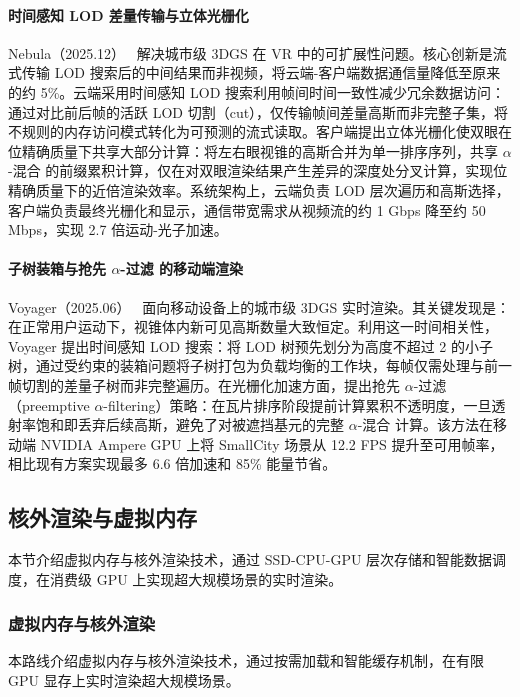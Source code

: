 \paragraph{时间感知 LOD 差量传输与立体光栅化}

Nebula（2025.12）~\cite{2512_20495} 解决城市级 3DGS 在 VR 中的可扩展性问题。核心创新是流式传输 LOD 搜索后的中间结果而非视频，将云端-客户端数据通信量降低至原来的约 5\%。云端采用时间感知 LOD 搜索利用帧间时间一致性减少冗余数据访问：通过对比前后帧的活跃 LOD 切割（cut），仅传输帧间差量高斯而非完整子集，将不规则的内存访问模式转化为可预测的流式读取。客户端提出立体光栅化使双眼在位精确质量下共享大部分计算：将左右眼视锥的高斯合并为单一排序序列，共享 $\alpha$-混合 的前缀累积计算，仅在对双眼渲染结果产生差异的深度处分叉计算，实现位精确质量下的近倍渲染效率。系统架构上，云端负责 LOD 层次遍历和高斯选择，客户端负责最终光栅化和显示，通信带宽需求从视频流的约 1 Gbps 降至约 50 Mbps，实现 2.7 倍运动-光子加速。

\paragraph{子树装箱与抢先 $\alpha$-过滤 的移动端渲染}

Voyager（2025.06）~\cite{2506_02774} 面向移动设备上的城市级 3DGS 实时渲染。其关键发现是：在正常用户运动下，视锥体内新可见高斯数量大致恒定。利用这一时间相关性，Voyager 提出时间感知 LOD 搜索：将 LOD 树预先划分为高度不超过 2 的小子树，通过受约束的装箱问题将子树打包为负载均衡的工作块，每帧仅需处理与前一帧切割的差量子树而非完整遍历。在光栅化加速方面，提出抢先 $\alpha$-过滤（preemptive $\alpha$-filtering）策略：在瓦片排序阶段提前计算累积不透明度，一旦透射率饱和即丢弃后续高斯，避免了对被遮挡基元的完整 $\alpha$-混合 计算。该方法在移动端 NVIDIA Ampere GPU 上将 SmallCity 场景从 12.2 FPS 提升至可用帧率，相比现有方案实现最多 6.6 倍加速和 85\% 能量节省。

\subsection{核外渲染与虚拟内存}
\label{ss:14_6}

本节介绍虚拟内存与核外渲染技术，通过 SSD-CPU-GPU 层次存储和智能数据调度，在消费级 GPU 上实现超大规模场景的实时渲染。

\subsubsection{虚拟内存与核外渲染}

本路线介绍虚拟内存与核外渲染技术，通过按需加载和智能缓存机制，在有限 GPU 显存上实时渲染超大规模场景。


